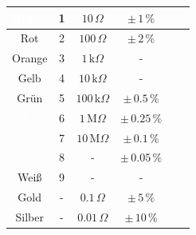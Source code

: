 \begin{frame}
{\begin{figure}[H]
\begin{minipage}[b]{1\textwidth}
{\begin{tabular}{|c|c|c|c|c|c|}
						\hline %
						\cellcolor{brown}\textcolor{white}{Braun}     & 1                      & $10\,\Omega$           & $\pm\, 1\,\%$     \\ %
						\hline %
						\cellcolor{red}Rot                            & 2                      & $100\,\Omega$          & $\pm\, 2\,\%$     \\ %
						\hline %
						\cellcolor{orange}Orange                      & 3                      & $1\,\text{k}\Omega$    & -                 \\ %
						\hline %
						\cellcolor{yellow}Gelb                        & 4                      & $10\,\text{k}\Omega$   & -                 \\ %
						\hline %
						\cellcolor{green}Grün                         & 5                      & $100\,\text{k}\Omega$  & $\pm\, 0.5\,\%$   \\ %
						\hline %
						\cellcolor{blue}\textcolor{white}{Blau}       & 6                      & $1\,\text{M}\Omega$    & $\pm\, 0.25\,\%$  \\ %
						\hline %
						\cellcolor{violet}\textcolor{white}{Violett}  & 7                      & $10\,\text{M}\Omega$   & $\pm\, 0.1\,\%$   \\ %
						\hline %
						\cellcolor{gray}\textcolor{white}{Grau}       & 8                      & -                      & $\pm\, 0.05\,\%$  \\ %
						\hline %
						Weiß                                          & 9                      & -                      & -                 \\ %
						\hline %
						\cellcolor{gold}Gold                          & -                      & $0.1\,\Omega$          & $\pm\,5\,\%$      \\ %
						\hline %
						\cellcolor{silver}Silber                      & -                      & $0.01\,\Omega$         & $\pm\,10\,\%$     \\ %
						\hline %
					\end{tabular}%
				}
			\end{minipage}
		\end{figure}


}
\end{frame}
